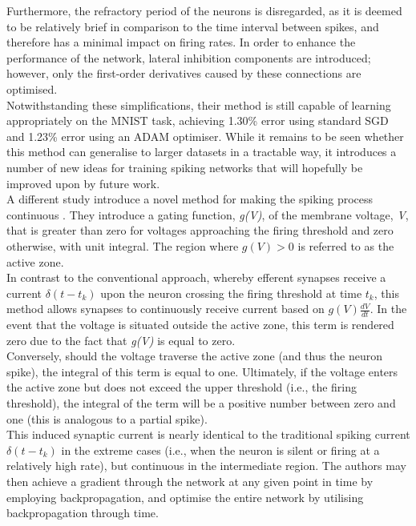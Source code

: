 \noindent Furthermore, the refractory period of the neurons is disregarded, as it is deemed to be relatively brief in comparison to the time interval between spikes, and therefore has a minimal impact on firing rates. In order to enhance the performance of the network, lateral inhibition components are introduced; however, only the first-order derivatives caused by these connections are optimised. \\

\noindent Notwithstanding these simplifications, their method is still capable of learning appropriately on the MNIST task, achieving 1.30\% error using standard SGD and 1.23\% error using an ADAM optimiser. While it remains to be seen whether this method can generalise to larger datasets in a tractable way, it introduces a number of new ideas for training spiking networks that will hopefully be improved upon by future work. \\

\noindent A different study introduce a novel method for making the spiking process continuous \cite{huh2018gradient}. They introduce a gating function, \textit{g(V)}, of the membrane voltage, \textit{V}, that is greater than zero for voltages approaching the firing threshold and zero otherwise, with unit integral. The region where $g(V) > 0$ is referred to as the active zone. \\

\noindent In contrast to the conventional approach, whereby efferent synapses receive a current $\delta (t - t_k)$ upon the neuron crossing the firing threshold at time $t_k$, this method allows synapses to continuously receive current based on $g(V)\frac{dV}{dt}$. In the event that the voltage is situated outside the active zone, this term is rendered zero due to the fact that \textit{g(V)} is equal to zero. \\

\noindent Conversely, should the voltage traverse the active zone (and thus the neuron spike), the integral of this term is equal to one. Ultimately, if the voltage enters the active zone but does not exceed the upper threshold (i.e., the firing threshold), the integral of the term will be a positive number between zero and one (this is analogous to a partial spike). \\

\noindent This induced synaptic current is nearly identical to the traditional spiking current $\delta (t - t_k)$ in the extreme cases (i.e., when the neuron is silent or firing at a relatively high rate), but continuous in the intermediate region. The authors may then achieve a gradient through the network at any given point in time by employing backpropagation, and optimise the entire network by utilising backpropagation through time.\\

